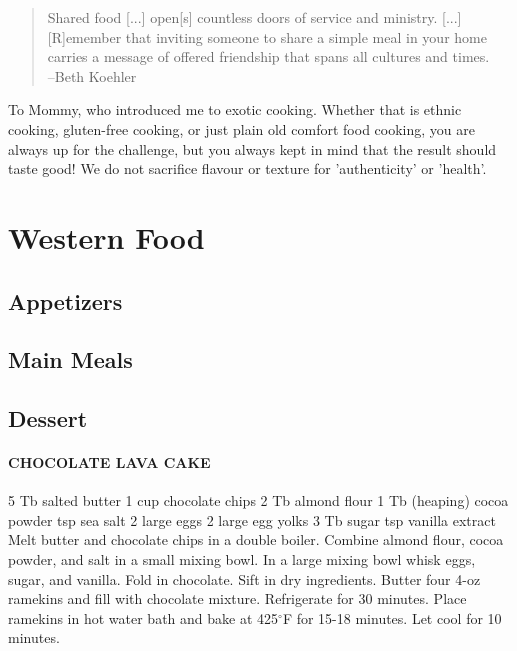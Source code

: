 \documentclass[oneside,11pt]{memoir} %
\begin{document}
\begin{quote}
Shared food [...] open[s] countless doors of service and ministry. [...] [R]emember that inviting someone to share a simple meal in your home carries a message of offered friendship that spans all cultures and times.\\
--Beth Koehler
\end{quote}

To Mommy, who introduced me to exotic cooking. Whether that is ethnic cooking, gluten-free cooking, or just plain old comfort food cooking, you are always up for the challenge, but you always kept in mind that the result should taste good! We do not sacrifice flavour or texture for 'authenticity' or 'health'.


\part{Western Food}

\chapter{Appetizers}
\chapter{Main Meals}
\chapter{Dessert}

\subsection{CHOCOLATE LAVA CAKE}  
	5 Tb salted butter	1 cup chocolate chips
	2 Tb almond flour	1 Tb (heaping) cocoa powder
	 tsp sea salt	2 large eggs
	2 large egg yolks	3 Tb sugar
	 tsp vanilla extract	
Melt butter and chocolate chips in a double boiler. Combine almond flour, cocoa powder, and salt in a small mixing bowl. In a large mixing bowl whisk eggs, sugar, and vanilla. Fold in chocolate. Sift in dry ingredients. Butter four 4-oz ramekins and fill with chocolate mixture. Refrigerate for 30 minutes. Place ramekins in hot water bath and bake at 425$^\circ$F for 15-18 minutes. Let cool for 10 minutes.
\end{document}
